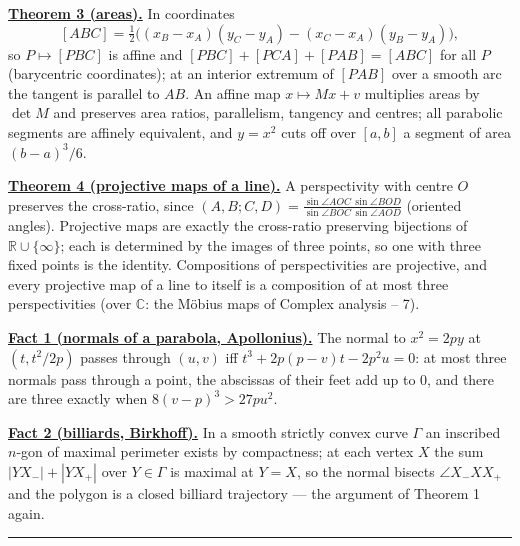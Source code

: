 \documentclass[11pt,a4paper]{article}
\newcommand{\head}[1]{\par\medskip\noindent\textbf{\underline{#1}}\quad}
\begin{document}
\head{Theorem 3 (areas).} In coordinates
\[
[ABC]=\tfrac12\bigl((x_B-x_A)(y_C-y_A)-(x_C-x_A)(y_B-y_A)\bigr),
\]
so $P\mapsto[PBC]$ is affine and $[PBC]+[PCA]+[PAB]=[ABC]$ for all $P$
(barycentric coordinates); at an interior extremum of $[PAB]$ over a smooth
arc the tangent is parallel to $AB$. An affine map $x\mapsto Mx+v$ multiplies
areas by $\det M$ and preserves area ratios, parallelism, tangency and
centres; all parabolic segments are affinely equivalent, and $y=x^2$ cuts off
over $[a,b]$ a segment of area $(b-a)^3/6$.

\head{Theorem 4 (projective maps of a line).} A perspectivity with centre
$O$ preserves the cross-ratio, since
$(A,B;C,D)=\frac{\sin\angle AOC\,\sin\angle BOD}{\sin\angle BOC\,\sin\angle AOD}$
(oriented angles). Projective maps are exactly the cross-ratio preserving
bijections of $\mathbb R\cup\{\infty\}$; each is determined by the images of
three points, so one with three fixed points is the identity. Compositions of
perspectivities are projective, and every projective map of a line to itself
is a composition of at most three perspectivities (over $\mathbb C$: the
M\"obius maps of Complex analysis -- 7).

\head{Fact 1 (normals of a parabola, Apollonius).} The normal to $x^2=2py$ at
$(t,t^2/2p)$ passes through $(u,v)$ iff $t^3+2p(p-v)t-2p^2u=0$: at most three
normals pass through a point, the abscissas of their feet add up to $0$, and
there are three exactly when $8(v-p)^3>27pu^2$.

\head{Fact 2 (billiards, Birkhoff).} In a smooth strictly convex curve $\Gamma$
an inscribed $n$-gon of maximal perimeter exists by compactness; at each
vertex $X$ the sum $|YX_-|+|YX_+|$ over $Y\in\Gamma$ is maximal at $Y=X$, so
the normal bisects $\angle X_-XX_+$ and the polygon is a closed billiard
trajectory --- the argument of Theorem 1 again.

\medskip\noindent\rule{\linewidth}{0.4pt}
\end{document}

